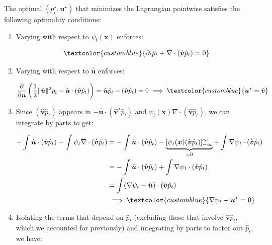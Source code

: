 \documentclass{article}
\newcommand{\bluetext}[1]{\textcolor{customblue}{#1}}
\begin{document}
The optimal $(p_t^\star, \boldsymbol{u}^\star)$ that minimizes the Lagrangian pointwise satisfies the following optimality conditions:
\begin{enumerate}
    \item[(i)] Varying with respect to $\psi_t(\boldsymbol{x})$ enforces:
    \begin{small}
    \begin{align}
        \bluetext{\partial_t\hat p_t+\nabla \cdot (\hat{\boldsymbol{v}} \hat p_t)=0}
    \end{align}
    \end{small}
    \item[(ii)] Varying with respect to $\hat{\boldsymbol{u}}$ enforces:
    \begin{small}
    \begin{align}
        \frac{\partial}{\partial \boldsymbol{u}} \left(\frac{1}{2}\|\hat{\boldsymbol{u}}\|^2p_t-\hat{\boldsymbol{u}}\cdot (\hat{\boldsymbol{v}} \hat p_t)\right)=\hat{\boldsymbol{u}} \hat p_t-(\hat{\boldsymbol{v}} \hat p_t)=0\implies \bluetext{\boldsymbol{u}^\star=\hat{\boldsymbol{v}}}
    \end{align}
    \end{small}
    \item[(iii)] Since $(\hat{\boldsymbol{v}} \hat p_t)$ appears in $-\hat{\boldsymbol{u}}\cdot (\hat{\boldsymbol{v}}^\star \hat p_t)$ and $\psi_t(\boldsymbol{x})\nabla\cdot (\hat{\boldsymbol{v}} \hat p_t)$, we can integrate by parts to get:
    \begin{small}
    \begin{align}
        -\int\hat{\boldsymbol{u}}\cdot (\hat{\boldsymbol{v}} \hat p_t)-\int\psi_t\nabla\cdot (\hat{\boldsymbol{v}} \hat p_t)&=-\int\hat{\boldsymbol{u}}\cdot (\hat{\boldsymbol{v}} \hat p_t)-\underbrace{[\psi_t (\boldsymbol{x})(\hat{\boldsymbol{v}} \hat p_t)]_{-\infty}^\infty}_{=0}+\int\nabla \psi_t\cdot (\hat{\boldsymbol{v}} \hat p_t)\nonumber\\
        &=-\int\hat{\boldsymbol{u}}\cdot (\hat{\boldsymbol{v}} \hat p_t)+\int\nabla \psi_t\cdot (\hat{\boldsymbol{v}} \hat p_t)\nonumber\\
        &=\int(\nabla \psi_t-\hat{\boldsymbol{u}})\cdot (\hat{\boldsymbol{v}} \hat p_t)\nonumber\\
        &\implies \bluetext{\nabla \psi_t-\boldsymbol{u}^\star=0}
    \end{align}
    \end{small}
    \item[(iv)] Isolating the terms that depend on $\hat p_t$ (excluding those that involve $\hat{\boldsymbol{v}} \hat p_t$, which we accounted for previously) and integrating by parts to factor out $\hat p_t$, we have:

\end{enumerate}
\end{document}
